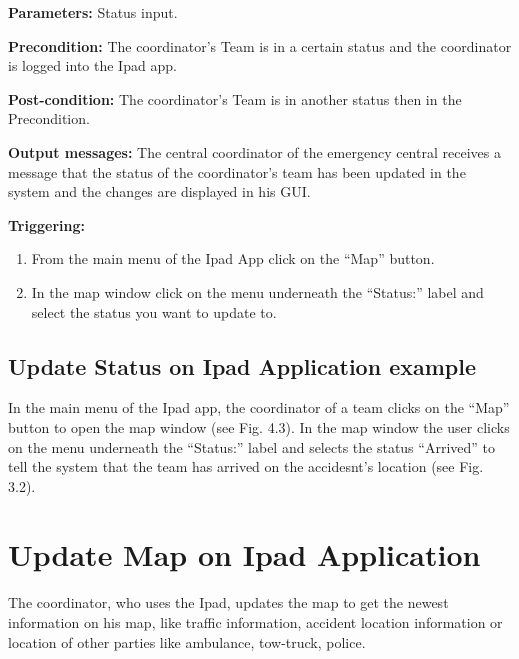 \begin{description}

\item \textbf{Parameters:} Status input.
\item \textbf{Precondition:} The coordinator's Team is in a certain status and
the coordinator is logged into the Ipad app.
\item \textbf{Post-condition:} The coordinator's Team is in another status then
in the Precondition.
\item \textbf{Output messages:} The central coordinator of the emergency central
receives a message that the status of the coordinator's team has been updated in
the system and the changes are displayed in his GUI.

\item \textbf{Triggering:} 
\begin{enumerate}
  \item From the main menu of the Ipad App click on the “Map” button.
  \item In the map window click on the menu underneath the “Status:” label and
  select the status you want to update to.
\end{enumerate}
\end{description}

 
\subsection{Update Status on Ipad Application example}
In the main menu of the Ipad app, the coordinator of a team clicks on the “Map”
button to open the map window (see Fig. 4.3). In the map window the user clicks
on the menu underneath the “Status:” label and selects the status “Arrived” to tell the system that the
team has arrived on the accidesnt's location (see Fig. 3.2).

\section{Update Map on Ipad Application}
\label{operation:MyOperation}
The coordinator, who uses the Ipad, updates the map to get the newest
information on his map, like traffic information, accident location information or location
of other parties like ambulance, tow-truck, police.

